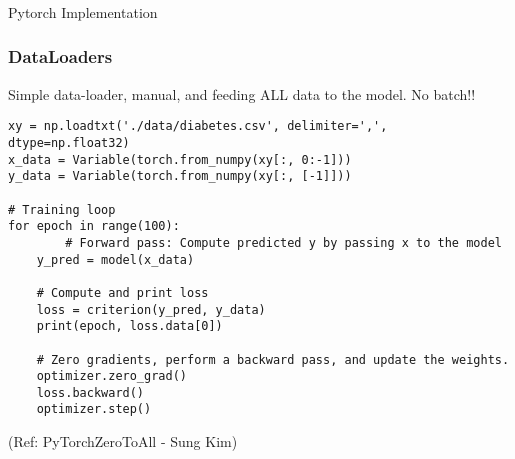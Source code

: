 


\begin{frame}[fragile]\frametitle{}

\begin{center}
{\Large Pytorch Implementation}
\end{center}
\end{frame}


\begin{frame}[fragile] \frametitle{DataLoaders}
Simple data-loader, manual, and feeding ALL data to the model. No batch!!
\begin{lstlisting}
xy = np.loadtxt('./data/diabetes.csv', delimiter=',', dtype=np.float32)
x_data = Variable(torch.from_numpy(xy[:, 0:-1]))
y_data = Variable(torch.from_numpy(xy[:, [-1]]))

# Training loop
for epoch in range(100):
        # Forward pass: Compute predicted y by passing x to the model
    y_pred = model(x_data)

    # Compute and print loss
    loss = criterion(y_pred, y_data)
    print(epoch, loss.data[0])

    # Zero gradients, perform a backward pass, and update the weights.
    optimizer.zero_grad()
    loss.backward()
    optimizer.step()
\end{lstlisting}

\tiny{(Ref: PyTorchZeroToAll  - Sung Kim)}
\end{frame}

